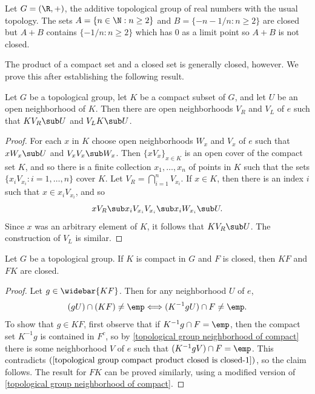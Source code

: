 \begin{example}
Let $G=(\R,+)$, the additive topological group of real numbers with the usual topology. The sets $A=\{n\in\N:n\geq 2\}$ and $B=\{-n-1/n:n\geq 2\}$ are closed but $A+B$ contains $\{-1/n:n\geq 2\}$ which has $0$ as a limit point so $A+B$ is not closed.
\end{example}
The product of a compact set and a closed set is generally closed, however. We prove this after establishing the following result.
\begin{proposition}\label{topological group neighborhood of compact}
Let $G$ be a topological group, let $K$ be a compact subset of $G$, and let $U$ be an open neighborhood of $K$. Then there are open neighborhoods $V_R$ and $V_L$ of $e$ such that $KV_R\sub U$ and $V_LK\sub U$.
\end{proposition}
\begin{proof}
For each $x$ in $K$ choose open neighborhoods $W_x$ and $V_x$ of $e$ such that $xW_x\sub U$ and $V_xV_x\sub W_x$. Then $\{xV_x\}_{x\in K}$ is an open cover of the compact set $K$, and so there is a finite collection $x_1,\dots,x_n$ of points in $K$ such that the sets $\{x_iV_{x_i}:i=1,\dots,n\}$ cover $K$. Let $V_R=\bigcap_{i=1}^{n}V_{x_i}$. If $x\in K$, then there is an index $i$ such that $x\in x_iV_{x_i}$, and so
\[xV_R\sub x_iV_{x_i}V_{x_i}\sub x_iW_{x_i}\sub U.\]
Since $x$ was an arbitrary element of $K$, it follows that $KV_R\sub U$. The construction of $V_L$ is similar.
\end{proof}
\begin{proposition}\label{topological group compact product closed is closed}
Let $G$ be a topological group. If $K$ is compact in $G$ and $F$ is closed, then $KF$ and $FK$ are closed.
\end{proposition}
\begin{proof}
Let $g\in\widebar{KF}$. Then for any neighborhood $U$ of $e$,
\begin{align}\label{topological group compact product closed is closed-1}
(gU)\cap(KF)\neq\emp\Longleftrightarrow(K^{-1}gU)\cap F\neq\emp.
\end{align}
To show that $g\in KF$, first observe that if $K^{-1}g\cap F=\emp$, then the compact set $K^{-1}g$ is contained in $F^{c}$, so by \cref{topological group neighborhood of compact} there is some neighborhood $V$ of $e$ such that $(K^{-1}gV)\cap F=\emp$. This contradicts $(\ref{topological group compact product closed is closed-1})$, so the claim follows. The result for $FK$ can be proved similarly, using a modified version of \cref{topological group neighborhood of compact}.
\end{proof}
